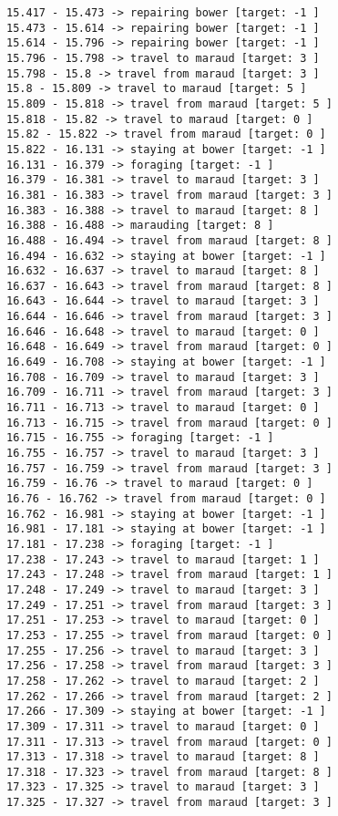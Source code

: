 \documentclass[11pt]{article}
\begin{document}
\begin{Verbatim}[commandchars=\\\{\}]
15.417 - 15.473 -> repairing bower [target: -1 ]
15.473 - 15.614 -> repairing bower [target: -1 ]
15.614 - 15.796 -> repairing bower [target: -1 ]
15.796 - 15.798 -> travel to maraud [target: 3 ]
15.798 - 15.8 -> travel from maraud [target: 3 ]
15.8 - 15.809 -> travel to maraud [target: 5 ]
15.809 - 15.818 -> travel from maraud [target: 5 ]
15.818 - 15.82 -> travel to maraud [target: 0 ]
15.82 - 15.822 -> travel from maraud [target: 0 ]
15.822 - 16.131 -> staying at bower [target: -1 ]
16.131 - 16.379 -> foraging [target: -1 ]
16.379 - 16.381 -> travel to maraud [target: 3 ]
16.381 - 16.383 -> travel from maraud [target: 3 ]
16.383 - 16.388 -> travel to maraud [target: 8 ]
16.388 - 16.488 -> marauding [target: 8 ]
16.488 - 16.494 -> travel from maraud [target: 8 ]
16.494 - 16.632 -> staying at bower [target: -1 ]
16.632 - 16.637 -> travel to maraud [target: 8 ]
16.637 - 16.643 -> travel from maraud [target: 8 ]
16.643 - 16.644 -> travel to maraud [target: 3 ]
16.644 - 16.646 -> travel from maraud [target: 3 ]
16.646 - 16.648 -> travel to maraud [target: 0 ]
16.648 - 16.649 -> travel from maraud [target: 0 ]
16.649 - 16.708 -> staying at bower [target: -1 ]
16.708 - 16.709 -> travel to maraud [target: 3 ]
16.709 - 16.711 -> travel from maraud [target: 3 ]
16.711 - 16.713 -> travel to maraud [target: 0 ]
16.713 - 16.715 -> travel from maraud [target: 0 ]
16.715 - 16.755 -> foraging [target: -1 ]
16.755 - 16.757 -> travel to maraud [target: 3 ]
16.757 - 16.759 -> travel from maraud [target: 3 ]
16.759 - 16.76 -> travel to maraud [target: 0 ]
16.76 - 16.762 -> travel from maraud [target: 0 ]
16.762 - 16.981 -> staying at bower [target: -1 ]
16.981 - 17.181 -> staying at bower [target: -1 ]
17.181 - 17.238 -> foraging [target: -1 ]
17.238 - 17.243 -> travel to maraud [target: 1 ]
17.243 - 17.248 -> travel from maraud [target: 1 ]
17.248 - 17.249 -> travel to maraud [target: 3 ]
17.249 - 17.251 -> travel from maraud [target: 3 ]
17.251 - 17.253 -> travel to maraud [target: 0 ]
17.253 - 17.255 -> travel from maraud [target: 0 ]
17.255 - 17.256 -> travel to maraud [target: 3 ]
17.256 - 17.258 -> travel from maraud [target: 3 ]
17.258 - 17.262 -> travel to maraud [target: 2 ]
17.262 - 17.266 -> travel from maraud [target: 2 ]
17.266 - 17.309 -> staying at bower [target: -1 ]
17.309 - 17.311 -> travel to maraud [target: 0 ]
17.311 - 17.313 -> travel from maraud [target: 0 ]
17.313 - 17.318 -> travel to maraud [target: 8 ]
17.318 - 17.323 -> travel from maraud [target: 8 ]
17.323 - 17.325 -> travel to maraud [target: 3 ]
17.325 - 17.327 -> travel from maraud [target: 3 ]

\end{Verbatim}
\end{document}
